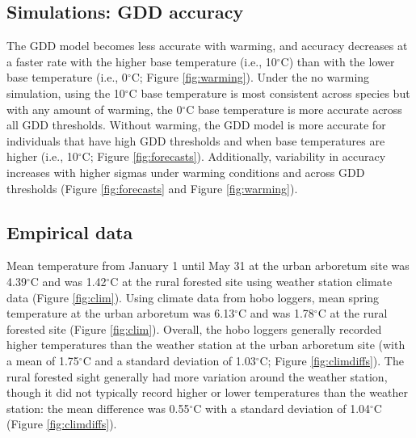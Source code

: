 \documentclass{article}\usepackage[]{graphicx}\usepackage[]{color}
\begin{document}
\subsection*{Simulations: GDD accuracy}
The GDD model becomes less accurate with warming, and accuracy decreases at a faster rate with the higher base temperature (i.e., 10$^{\circ}$C) than with the lower base temperature (i.e., 0$^{\circ}$C; Figure \ref{fig:warming}). Under the no warming simulation, using the 10$^{\circ}$C base temperature is most consistent across species but with any amount of warming, the 0$^{\circ}$C base temperature is more accurate across all GDD thresholds. Without warming, the GDD model is more accurate for individuals that have high GDD thresholds and when base temperatures are higher (i.e., 10$^{\circ}$C; Figure \ref{fig:forecasts}). Additionally, variability in accuracy increases with higher sigmas under warming conditions and across GDD thresholds  (Figure \ref{fig:forecasts} and Figure \ref{fig:warming}).

\subsection*{Empirical data} 
Mean temperature from January 1 until May 31 at the urban arboretum site was 4.39$^{\circ}$C and was 1.42$^{\circ}$C at the rural forested site using weather station climate data (Figure \ref{fig:clim}). Using climate data from hobo loggers, mean spring temperature at the urban arboretum was 6.13$^{\circ}$C and was 1.78$^{\circ}$C at the rural forested site (Figure \ref{fig:clim}). Overall, the hobo loggers generally recorded higher temperatures than the weather station at the urban arboretum site (with a mean of 1.75$^{\circ}$C and a standard deviation of 1.03$^{\circ}$C; Figure \ref{fig:climdiffs}). The rural forested sight generally had more variation around the weather station, though it did not typically record higher or lower temperatures than the weather station: the mean difference was 0.55$^{\circ}$C with a standard deviation of 1.04$^{\circ}$C (Figure \ref{fig:climdiffs}).
\end{document}

